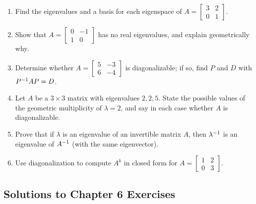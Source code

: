 \begin{enumerate}[label=\textbf{6.\arabic*},leftmargin=2.6em,itemsep=6pt]
\item Find the eigenvalues and a basis for each eigenspace of $A=\left[\begin{smallmatrix}3&2\\0&1\end{smallmatrix}\right]$.

\item Show that $A=\left[\begin{smallmatrix}0&-1\\1&0\end{smallmatrix}\right]$ has no real eigenvalues, and explain geometrically why.

\item Determine whether $A=\left[\begin{smallmatrix}5&-3\\6&-4\end{smallmatrix}\right]$ is diagonalizable; if so, find $P$ and $D$ with $P^{-1} AP=D$.

\item Let $A$ be a $3\times3$ matrix with eigenvalues $2,2,5$. State the possible values of the geometric multiplicity of $\lambda=2$, and say in each case whether $A$ is diagonalizable.

\item Prove that if $\lambda$ is an eigenvalue of an invertible matrix $A$, then $\lambda^{-1}$ is an eigenvalue of $A^{-1}$ (with the same eigenvector).

\item Use diagonalization to compute $A^k$ in closed form for $A=\left[\begin{smallmatrix}1&2\\0&3\end{smallmatrix}\right]$.
\end{enumerate}

\subsection*{Solutions to Chapter 6 Exercises}

